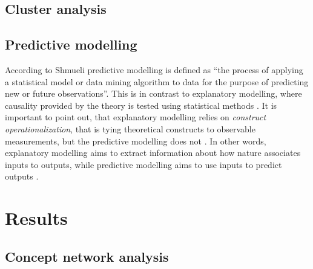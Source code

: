 \documentclass[utf8,english]{gradu3}
\begin{document}

\section{Cluster analysis}





\section{Predictive modelling}

According to Shmueli \parencite*{shmueliExplainPredict2010} predictive modelling is defined as \enquote{the process of applying a statistical model or data mining algorithm to data for the purpose of predicting new or future observations}. This is in contrast to explanatory modelling, where causality provided by the theory is tested using statistical methods \parencite{shmueliExplainPredict2010}. It is important to point out, that explanatory modelling relies on \emph{construct operationalization}, that is tying theoretical constructs to observable measurements, but the predictive modelling does not \parencite{shmueliExplainPredict2010}. In other words, explanatory modelling aims to extract information about how nature associates inputs to outputs, while predictive modelling aims to use inputs to predict outputs \parencite{breimanStatisticalModelingTwo2001}.



\chapter{Results}



\section{Concept network analysis}
\end{document}
